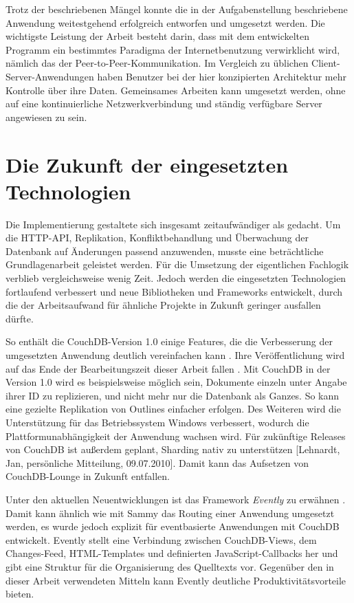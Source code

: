 Trotz der beschriebenen Mängel konnte die in der Aufgabenstellung beschriebene Anwendung weitestgehend erfolgreich entworfen und umgesetzt werden. Die wichtigste Leistung der Arbeit besteht darin, dass mit dem entwickelten Programm ein bestimmtes Paradigma der Internetbenutzung verwirklicht wird, nämlich das der Peer-to-Peer-Kommunikation. Im Vergleich zu üblichen Client-Server-Anwendungen haben Benutzer bei der hier konzipierten Architektur mehr Kontrolle über ihre Daten. Gemeinsames Arbeiten kann umgesetzt werden, ohne auf eine kontinuierliche Netzwerkverbindung und ständig verfügbare Server angewiesen zu sein.


\section{Die Zukunft der eingesetzten Technologien}

Die Implementierung gestaltete sich insgesamt zeitaufwändiger als gedacht. Um die HTTP-API, Replikation, Konfliktbehandlung und Überwachung der Datenbank auf Änderungen passend anzuwenden, musste eine beträchtliche Grundlagenarbeit geleistet werden. Für die Umsetzung der eigentlichen Fachlogik verblieb vergleichsweise wenig Zeit. Jedoch werden die eingesetzten Technologien fortlaufend verbessert und neue Bibliotheken und Frameworks entwickelt, durch die der Arbeitsaufwand für ähnliche Projekte in Zukunft geringer ausfallen dürfte. 

So enthält die CouchDB-Version 1.0 einige Features, die die Verbesserung der umgesetzten Anwendung deutlich vereinfachen kann \cite{couch:whatsnew}. Ihre Veröffentlichung wird auf das Ende der Bearbeitungszeit dieser Arbeit fallen \cite{couch:release1.0}. Mit CouchDB in der Version 1.0 wird es beispielsweise möglich sein, Dokumente einzeln unter Angabe ihrer ID zu replizieren, und nicht mehr nur die Datenbank als Ganzes. So kann eine gezielte Replikation von Outlines einfacher erfolgen. Des Weiteren wird die Unterstützung für das Betriebssystem Windows verbessert, wodurch die Plattformunabhängigkeit der Anwendung wachsen wird. Für zukünftige Releases von CouchDB ist außerdem geplant, Sharding nativ zu unterstützen [Lehnardt, Jan, persönliche Mitteilung, 09.07.2010]. Damit kann das Aufsetzen von CouchDB-Lounge in Zukunft entfallen.

Unter den aktuellen Neuentwicklungen ist das Framework \textit{Evently} zu erwähnen \cite{evently:website}. Damit kann ähnlich wie mit Sammy das Routing einer Anwendung umgesetzt werden, es wurde jedoch explizit für eventbasierte Anwendungen mit CouchDB entwickelt. Evently stellt eine Verbindung zwischen CouchDB-Views, dem Changes-Feed, HTML-Templates und definierten JavaScript-Callbacks her und gibt eine Struktur für die Organisierung des Quelltexts vor. Gegenüber den in dieser Arbeit verwendeten Mitteln kann Evently deutliche Produktivitätsvorteile bieten.
  

